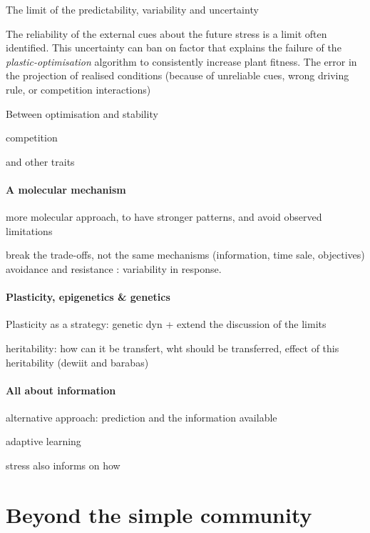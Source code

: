The limit of the predictability, variability and uncertainty

The reliability of the external cues about the future stress is a limit often identified.  This uncertainty can ban on factor that explains the failure of the \textit{plastic-optimisation} algorithm to consistently increase plant fitness. The error in the projection of realised conditions (because of unreliable cues, wrong driving rule, or competition interactions)   %

Between optimisation and stability

competition %

and other traits 

\paragraph{A molecular mechanism}

more molecular approach, to have stronger patterns, and avoid observed limitations

break the trade-offs, not the same mechanisms (information, time sale, objectives)
avoidance and resistance : variability in response.

\paragraph{Plasticity, epigenetics \& genetics}

Plasticity as a strategy: genetic dyn + extend the discussion of the limits

heritability: how can it be transfert, wht should be transferred, effect of this heritability (dewiit and barabas)

\paragraph{All about information}

alternative approach: prediction and the information available

adaptive learning

stress also informs on how 


\section{Beyond the simple community}

